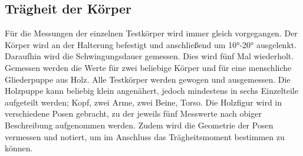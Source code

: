 \subsection{Trägheit der Körper}
Für die Messungen der einzelnen Testkörper wird immer gleich vorgegangen. Der Körper wird an der Halterung befestigt und anschließend um \ang{10;;}-\ang{20;;} ausgelenkt.
Daraufhin wird die Schwingungsdauer gemessen. Dies wird fünf Mal wiederholt. Gemessen werden die Werte für zwei beliebige Körper und für eine menschliche 
Gliederpuppe aus Holz. Alle Testkörper werden gewogen und ausgemessen. Die Holzpuppe kann beliebig klein angenähert, jedoch mindestens in sechs Einzelteile aufgeteilt werden;
Kopf, zwei Arme, zwei Beine, Torso. Die Holzfigur wird in verschiedene Posen gebracht, zu der jeweils fünf Messwerte nach obiger Beschreibung aufgenommen werden.
Zudem wird die Geometrie der Posen vermessen und notiert, um im Anschluss das Trägheitsmoment bestimmen zu können.